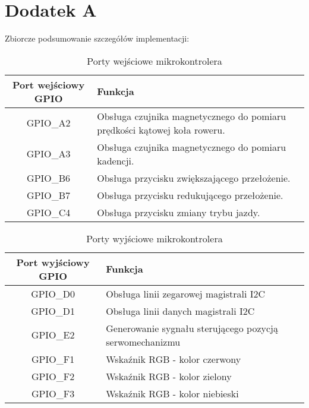 \chapter{Dodatek A}

Zbiorcze podsumowanie szczegółów implementacji:
\begin{table}[h]
    \caption{Porty wejściowe mikrokontrolera}
    \begin{center}
		\label{tab:portyGPIO}
		\begin{tabular}{|c|>{\centering}m{6.5cm}|}
 			\hline
 			\textbf{Port wejściowy GPIO} & \textbf{Funkcja} \tabularnewline
 			\hline
 			GPIO\_A2 & Obsługa czujnika magnetycznego do pomiaru prędkości kątowej koła roweru. \tabularnewline
 			\hline
 			GPIO\_A3 &  Obsługa czujnika magnetycznego do pomiaru kadencji. \tabularnewline
 			\hline
 			GPIO\_B6 & Obsługa przycisku zwiększającego przełożenie. \tabularnewline
 			\hline
 			GPIO\_B7 &  Obsługa przycisku redukującego przełożenie.\tabularnewline
 			\hline
 			GPIO\_C4 & Obsługa przycisku zmiany trybu jazdy. \tabularnewline
 			\hline
		\end{tabular}
	\end{center}
\end{table}

\begin{table}[h]
    \caption{Porty wyjściowe mikrokontrolera}
    \begin{center}
		\label{tab:portyGPIO}
		\begin{tabular}{|c|>{\centering}m{6.5cm}|}
 			\hline
 			\textbf{Port wyjściowy GPIO} & \textbf{Funkcja} \tabularnewline
 			\hline
 			GPIO\_D0 & Obsługa linii zegarowej magistrali I2C \tabularnewline
 			\hline
 			GPIO\_D1 & Obsługa linii danych magistrali I2C \tabularnewline
 			\hline
 			GPIO\_E2 & Generowanie sygnału sterującego pozycją serwomechanizmu \tabularnewline
 			\hline
 			GPIO\_F1 & Wskaźnik RGB - kolor czerwony  \tabularnewline
			\hline
 			GPIO\_F2 &  Wskaźnik RGB - kolor zielony\tabularnewline
			\hline
 			GPIO\_F3 &  Wskaźnik RGB - kolor niebieski\tabularnewline
			\hline
		\end{tabular}
	\end{center}
\end{table}

